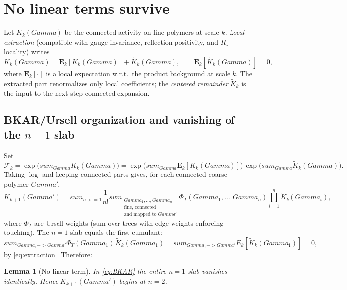 \documentclass[11pt]{article}
\def\;{ }%
\def\Gamma{Gamma}%
\def\E{E}%
\def\sum{sum}%
\def\ge{>=}%
\def\to{->}%
\newtheorem{lemma}[theorem]{Lemma}
\theoremstyle{definition}
\theoremstyle{remark}
\newcommand{\E}{\mathbb{E}}
\newcommand{\1}{\mathbbm{1}}
\newcommand{\pdfmath}[2]{\texorpdfstring{#1}{#2}}
\begin{document}
\section[\pdfmath{No linear terms}{no-linear}]{No linear terms survive}
\label{sec:nolinear}
Let $K_k(\Gamma)$ be the connected activity on fine polymers at scale $k$.
\emph{Local extraction} (compatible with gauge invariance, reflection positivity, and $R_\star$-locality) writes
\begin{equation}\label{eq:extraction}
K_k(\Gamma)\;=\;\mathbf{E}_k\!\left[K_k(\Gamma)\right]\;+\;\widetilde K_k(\Gamma),
\qquad \mathbf{E}_k\!\left[\widetilde K_k(\Gamma)\right]=0,
\end{equation}
where $\mathbf{E}_k[\cdot]$ is a local expectation w.r.t.\ the product background at scale $k$.
The extracted part renormalizes only local coefficients; the \emph{centered remainder} $\widetilde K_k$ is the input to the next-step connected expansion.

\subsection*{BKAR/Ursell organization and vanishing of the $n{=}1$ slab}
Set
\[
\mathcal{F}_k=\exp\!\Big(\sum_{\Gamma}K_k(\Gamma)\Big)
=\exp\!\Big(\sum_{\Gamma}\mathbf{E}_k[K_k(\Gamma)]\Big)\,
  \exp\!\Big(\sum_{\Gamma}\widetilde K_k(\Gamma)\Big).
\]
Taking $\log$ and keeping connected parts gives, for each connected coarse polymer $\Gamma'$,
\begin{equation}\label{eq:BKAR}
K_{k+1}(\Gamma')
=\sum_{n\ge 1}\frac{1}{n!}
\sum_{\substack{\Gamma_1,\dots,\Gamma_n\\ \text{fine, connected}\\ \text{and mapped to }\Gamma'}}
\Phi_T(\Gamma_1,\dots,\Gamma_n)\prod_{i=1}^n \widetilde K_k(\Gamma_i),
\end{equation}
where $\Phi_T$ are Ursell weights (sum over trees with edge-weights enforcing touching).
The $n=1$ slab equals the first cumulant:
\[
\sum_{\Gamma_1\to\Gamma'} \Phi_T(\Gamma_1)\,\widetilde K_k(\Gamma_1)
=\sum_{\Gamma_1\to\Gamma'} \E_k\!\left[\widetilde K_k(\Gamma_1)\right]=0,
\]
by \eqref{eq:extraction}. Therefore:

\begin{lemma}[No linear term]\label{lem:nolinear}
In \eqref{eq:BKAR} the entire $n=1$ slab vanishes identically. Hence $K_{k+1}(\Gamma')$ begins at $n=2$.
\end{lemma}
\end{document}
